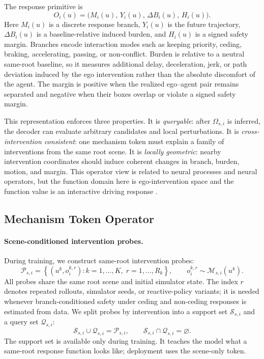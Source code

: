 \documentclass[10pt]{article}
\newcommand{\cM}{\mathcal{M}}
\newcommand{\cP}{\mathcal{P}}
\newcommand{\cQ}{\mathcal{Q}}
\newcommand{\cS}{\mathcal{S}}
\begin{document}
The response primitive is
\begin{equation}
    O_i(u)
    =
    \Big(
    M_i(u),\,
    Y_i(u),\,
    \Delta B_i(u),\,
    H_i(u)
    \Big).
    \label{eq:response_primitive}
\end{equation}
Here \(M_i(u)\) is a discrete response branch, \(Y_i(u)\) is the future trajectory, \(\Delta B_i(u)\) is a baseline-relative induced burden, and \(H_i(u)\) is a signed safety margin. Branches encode interaction modes such as keeping priority, ceding, braking, accelerating, passing, or non-conflict. Burden is relative to a neutral same-root baseline, so it measures additional delay, deceleration, jerk, or path deviation induced by the ego intervention rather than the absolute discomfort of the agent. The margin is positive when the realized ego--agent pair remains separated and negative when their boxes overlap or violate a signed safety margin.

This representation enforces three properties. It is \emph{queryable}: after \(\Omega_{s,i}\) is inferred, the decoder can evaluate arbitrary candidates and local perturbations. It is \emph{cross-intervention consistent}: one mechanism token must explain a family of interventions from the same root scene. It is \emph{locally geometric}: nearby intervention coordinates should induce coherent changes in branch, burden, motion, and margin. This operator view is related to neural processes and neural operators, but the function domain here is ego-intervention space and the function value is an interactive driving response \parencite{garnelo2018conditional,kim2019attentive,kovachki2023neural}.

\subsection{Mechanism Token Operator}
\label{sec:method_token_operator}

\paragraph{Scene-conditioned intervention probes.}
During training, we construct same-root intervention probes:
\begin{equation}
    \cP_{s,i}
    =
    \left\{
    \left(u^k,o_i^{k,r}\right)
    :
    k=1,\ldots,K,\; r=1,\ldots,R_k
    \right\},
    \qquad
    o_i^{k,r}\sim \cM_{s,i}(u^k).
    \label{eq:probe_set}
\end{equation}
All probes share the same root scene and initial simulator state. The index \(r\) denotes repeated rollouts, simulator seeds, or reactive-policy variants; it is needed whenever branch-conditioned safety under ceding and non-ceding responses is estimated from data. We split probes by intervention into a support set \(\cS_{s,i}\) and a query set \(\cQ_{s,i}\):
\begin{equation}
    \cS_{s,i}\cup \cQ_{s,i}=\cP_{s,i},
    \qquad
    \cS_{s,i}\cap \cQ_{s,i}=\varnothing.
\end{equation}
The support set is available only during training. It teaches the model what a same-root response function looks like; deployment uses the scene-only token.
\end{document}
